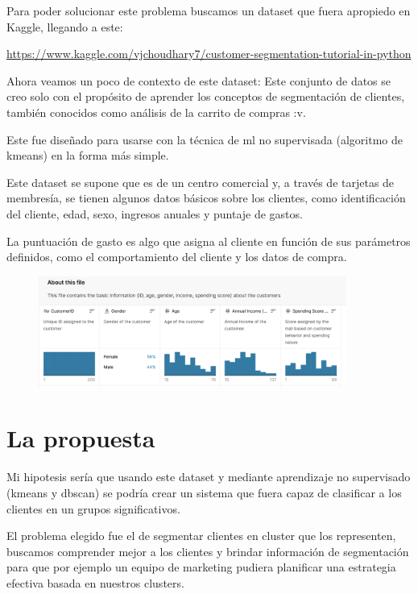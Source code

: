\documentclass[12pt, fleqn]{report}                             %
\theoremstyle{break}                                            %
\begin{document}
        Para poder solucionar este problema buscamos un dataset que fuera apropiedo en Kaggle, llegando a este:

        \url{https://www.kaggle.com/vjchoudhary7/customer-segmentation-tutorial-in-python}

        Ahora veamos un poco de contexto de este dataset:
        Este conjunto de datos se creo solo con el propósito de aprender los conceptos de 
        segmentación de clientes, también conocidos como análisis de la carrito de compras :v. 

        Este fue diseñado para usarse con la técnica de ml no supervisada (algoritmo de kmeans) en la forma más simple.
        
        Este dataset se supone que es de un centro comercial y, a través de tarjetas de membresía, 
        se tienen algunos datos básicos sobre los clientes, como identificación del cliente, 
        edad, sexo, ingresos anuales y puntaje de gastos.

        La puntuación de gasto es algo que asigna al cliente en función de sus parámetros definidos,
        como el comportamiento del cliente y los datos de compra.

        \begin{figure}[h!]
            \centering
            \includegraphics[width=0.9\textwidth]{x}
        \end{figure}

    \chapter{La propuesta}
        Mi hipotesis sería que usando este dataset y 
        mediante aprendizaje no supervisado (kmeans y dbscan) se podría crear un sistema que fuera capaz de clasificar
        a los clientes en un grupos significativos.

        El problema elegido fue el de segmentar clientes en cluster que los representen, buscamos comprender mejor a los
        clientes y brindar información de segmentación para que por ejemplo un equipo de marketing pudiera planificar
        una estrategia efectiva basada en nuestros clusters.
\end{document}
